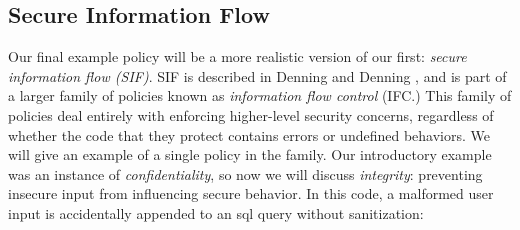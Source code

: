 \documentclass{llncs}
\begin{document}





\subsection{Secure Information Flow}
\label{sec:SIF}

Our final example policy will be a more realistic version of our first:
{\em secure information flow (SIF)}. SIF is described in Denning and Denning
\cite{Denning77:SecureInformationFlow}, and is part of a larger family of policies
known as {\em information flow control} (IFC.) This family of policies deal entirely with enforcing
higher-level security concerns, regardless of whether the code that they protect contains
errors or undefined behaviors. We will give an example of a single policy in the family.
Our introductory example was an instance of {\em confidentiality}, so now we will discuss
{\em integrity}: preventing insecure input from influencing secure behavior.
In this code, a malformed user input is accidentally appended to an sql query without sanitization:
\end{document}
